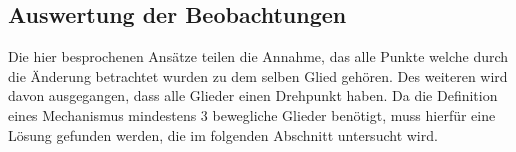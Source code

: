 \subsection{Auswertung der Beobachtungen}


Die hier besprochenen Ansätze teilen die Annahme, das alle Punkte welche durch die Änderung betrachtet wurden zu dem selben Glied gehören.
Des weiteren wird davon ausgegangen, dass alle Glieder einen Drehpunkt haben.
Da die Definition eines Mechanismus mindestens 3 bewegliche Glieder benötigt, muss hierfür eine Lösung gefunden werden, die im folgenden Abschnitt untersucht wird.


